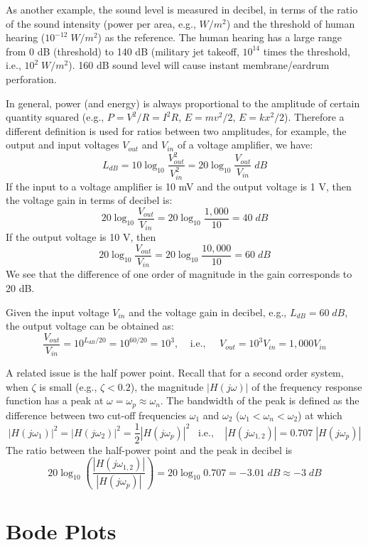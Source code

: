 As another example, the sound level is measured in decibel, in terms of the ratio
of the sound intensity (power per area, e.g., $W/m^2$) and the threshold of human 
hearing ($10^{-12}\; W/m^2$) as the reference. The human hearing has a large range 
from 0 dB (threshold) to 140 dB (military jet takeoff, $10^{14}$ times the threshold, 
i.e., $10^2\; W/m^2$). 160 dB sound level will cause instant membrane/eardrum 
perforation.

In general, power (and energy) is always proportional to the amplitude of certain
quantity squared (e.g., $P=V^2/R=I^2 R$, $E=mv^2/2$, $E=kx^2/2$). Therefore a 
different definition is used for ratios between two amplitudes, for example, the
output and input voltages $V_{out}$ and $V_{in}$ of a voltage amplifier, we have:
\[ L_{dB}=10 \log_{10} \frac{V^2_{out}}{V^2_{in}}
=20 \log_{10} \frac{V_{out}}{V_{in}}\;dB \]
If the input to a voltage amplifier is 10 mV and the output voltage is 1 V, then the
voltage gain in terms of decibel is:
\[ 20 \log_{10} \frac{V_{out}}{V_{in}}=20 \log_{10} \frac{1,000}{10}=40\; dB \]
If the output voltage is 10 V, then
\[ 20 \log_{10} \frac{V_{out}}{V_{in}}=20 \log_{10} \frac{10,000}{10}=60\; dB \]
We see that the difference of one order of magnitude in the gain corresponds to 20 dB.

Given the input voltage $V_{in}$ and the voltage gain in decibel, e.g., $L_{dB}=60\;dB$, 
the output voltage can be obtained as:
\[ \frac{V_{out}}{V_{in}}=10^{L_{dB}/20}=10^{60/20}=10^3,
\;\;\;\;\mbox{i.e.,}\;\;\;\;\; V_{out}=10^3 V_{in}=1,000 V_{in} \]

A related issue is the half power point. Recall that for a second order system, when
$\zeta$ is small (e.g., $\zeta<0.2$), the magnitude $|H(j\omega)|$ of the frequency 
response function has a peak at $\omega=\omega_p\approx \omega_n$. The bandwidth of 
the peak is defined as the difference between two cut-off frequencies $\omega_1$ 
and $\omega_2$ ($\omega_1<\omega_n < \omega_2$) at which 
\[ |H(j\omega_1)|^2=|H(j\omega_2)|^2=\frac{1}{2} |H(j\omega_p)|^2\;\;\;\mbox{i.e.,}\;\;\;\;
   | H(j\omega_{1,2}) |=0.707\; | H(j\omega_p) | \]
The ratio between the half-power point and the peak in decibel is
\[ 20 \log_{10} \left( \frac{ |H(j\omega_{1,2})|}{| H(j\omega_p) |} \right)
=20 \log_{10} 0.707=-3.01\;dB \approx -3\;dB \]

\section*{Bode Plots}


